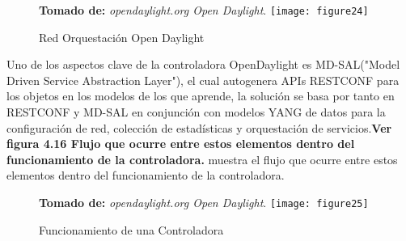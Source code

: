\begin{figure}[htbp]
 \textbf{Tomado de:} \textit{opendaylight.org Open Daylight}.
  \centering
    {\texttt{[image: figure24]}}%
  \caption{\footnotesize{Red Orquestación Open Daylight}}
  \label{fig:fig2subfig}
\end{figure}

Uno de los aspectos clave de la controladora OpenDaylight es MD-SAL("Model Driven Service Abstraction Layer"), el cual autogenera APIs RESTCONF para los objetos en
los modelos de los que aprende, la solución se basa por tanto en RESTCONF y MD-SAL en conjunción con modelos YANG de datos para la configuración de red, colección de estadísticas y orquestación de servicios.\textbf{Ver figura 4.16 Flujo que ocurre entre estos elementos dentro del funcionamiento de la controladora.} muestra el flujo que ocurre entre estos elementos dentro del funcionamiento de la controladora.

\begin{figure}[htbp]
 \textbf{Tomado de:} \textit{opendaylight.org Open Daylight}.
  \centering
    {\texttt{[image: figure25]}}%
  \caption{\footnotesize{Funcionamiento de una Controladora}}
  \label{fig:fig2subfig}
\end{figure}





